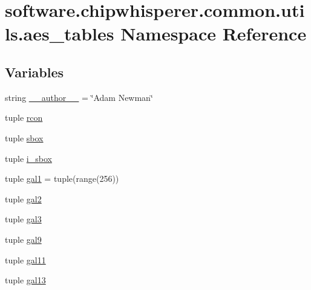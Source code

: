 \hypertarget{namespacesoftware_1_1chipwhisperer_1_1common_1_1utils_1_1aes__tables}{}\section{software.\+chipwhisperer.\+common.\+utils.\+aes\+\_\+tables Namespace Reference}
\label{namespacesoftware_1_1chipwhisperer_1_1common_1_1utils_1_1aes__tables}
\subsection*{Variables}
\begin{DoxyCompactItemize}
\item 
string \hyperlink{namespacesoftware_1_1chipwhisperer_1_1common_1_1utils_1_1aes__tables_a5bdf3ad5a7320d31ff6ed501039aa318}{\+\_\+\+\_\+author\+\_\+\+\_\+} = \char`\"{}Adam Newman\char`\"{}
\item 
tuple \hyperlink{namespacesoftware_1_1chipwhisperer_1_1common_1_1utils_1_1aes__tables_ae93089d334185cfea043114defec83dd}{rcon}
\item 
tuple \hyperlink{namespacesoftware_1_1chipwhisperer_1_1common_1_1utils_1_1aes__tables_ab29ec75e9f1c27e4d0e14aa03b1558ba}{sbox}
\item 
tuple \hyperlink{namespacesoftware_1_1chipwhisperer_1_1common_1_1utils_1_1aes__tables_a58b699577981a13413d947ffc853b937}{i\+\_\+sbox}
\item 
tuple \hyperlink{namespacesoftware_1_1chipwhisperer_1_1common_1_1utils_1_1aes__tables_a8db7db3cf4ca416d399871ffe89e1322}{gal1} = tuple(range(256))
\item 
tuple \hyperlink{namespacesoftware_1_1chipwhisperer_1_1common_1_1utils_1_1aes__tables_a0ac094d352370182a354f0e394cdeb5f}{gal2}
\item 
tuple \hyperlink{namespacesoftware_1_1chipwhisperer_1_1common_1_1utils_1_1aes__tables_afccddd28f57f23c2289277deb3dc8f61}{gal3}
\item 
tuple \hyperlink{namespacesoftware_1_1chipwhisperer_1_1common_1_1utils_1_1aes__tables_acd6562231fb0f517aa9ccf026745606a}{gal9}
\item 
tuple \hyperlink{namespacesoftware_1_1chipwhisperer_1_1common_1_1utils_1_1aes__tables_af10137d96fddc559ceabb73ee844ecb3}{gal11}
\item 
tuple \hyperlink{namespacesoftware_1_1chipwhisperer_1_1common_1_1utils_1_1aes__tables_a889f148d039807d1f829cd3c63058d94}{gal13}

\end{DoxyCompactItemize}
